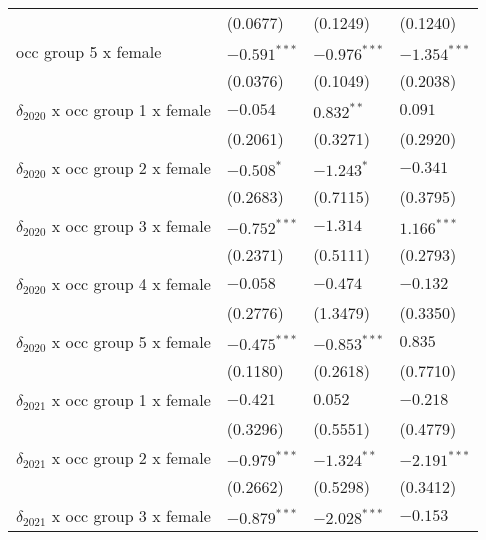 \begin{tabular}{llll}
                                       &           (0.0677) &           (0.1249) &           (0.1240) \\
occ group 5 x female                   &     $-0.591^{***}$ &     $-0.976^{***}$ &     $-1.354^{***}$ \\
                                       &           (0.0376) &           (0.1049) &           (0.2038) \\
$\delta_{2020}$ x occ group 1 x female &           $-0.054$ &       $0.832^{**}$ &            $0.091$ \\
                                       &           (0.2061) &           (0.3271) &           (0.2920) \\
$\delta_{2020}$ x occ group 2 x female &         $-0.508^*$ &         $-1.243^*$ &           $-0.341$ \\
                                       &           (0.2683) &           (0.7115) &           (0.3795) \\
$\delta_{2020}$ x occ group 3 x female &     $-0.752^{***}$ &           $-1.314$ &      $1.166^{***}$ \\
                                       &           (0.2371) &           (0.5111) &           (0.2793) \\
$\delta_{2020}$ x occ group 4 x female &           $-0.058$ &           $-0.474$ &           $-0.132$ \\
                                       &           (0.2776) &           (1.3479) &           (0.3350) \\
$\delta_{2020}$ x occ group 5 x female &     $-0.475^{***}$ &     $-0.853^{***}$ &            $0.835$ \\
                                       &           (0.1180) &           (0.2618) &           (0.7710) \\
$\delta_{2021}$ x occ group 1 x female &           $-0.421$ &            $0.052$ &           $-0.218$ \\
                                       &           (0.3296) &           (0.5551) &           (0.4779) \\
$\delta_{2021}$ x occ group 2 x female &     $-0.979^{***}$ &      $-1.324^{**}$ &     $-2.191^{***}$ \\
                                       &           (0.2662) &           (0.5298) &           (0.3412) \\
$\delta_{2021}$ x occ group 3 x female &     $-0.879^{***}$ &     $-2.028^{***}$ &           $-0.153$ \\

\end{tabular}
